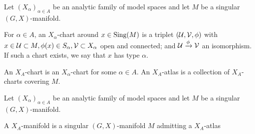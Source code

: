 \begin{defi}[$X_A$-atlas]\label{def:atlas}
  Let $(X_\alpha)_{\alpha\in A}$ be an analytic family of model spaces and let $M$ be a singular $(G,X)$-manifold.
    
  For $\alpha\in A$, an $X_\alpha$-chart around $x\in \mathrm{Sing}(M)$ is a triplet $(\mathcal{U},\mathcal V,\phi)$ with $x\in \mathcal{U}\subset M,\phi(x)\in S_\alpha, \mathcal V\subset X_\alpha$ open and connected;  and $\mathcal{U}\xrightarrow{\phi} \mathcal V$ an isomorphism. If such a chart exists, we say that $x$ has type $\alpha$. 
  
  An $X_A$-chart is an $X_\alpha$-chart for some $\alpha\in A$.  
  An $X_A$-atlas is a collection of $X_A$-charts covering $M$.
\end{defi}
\begin{defi}\label{def:analytic_family_model_spaces}
  Let $(X_\alpha)_{\alpha\in A}$ be an analytic family of model spaces and let $M$ be a singular $(G,X)$-manifold.
  
  A $X_A$-manifold is a singular $(G,X)$-manifold $M$  admitting  a $X_A$-atlas
\end{defi}



